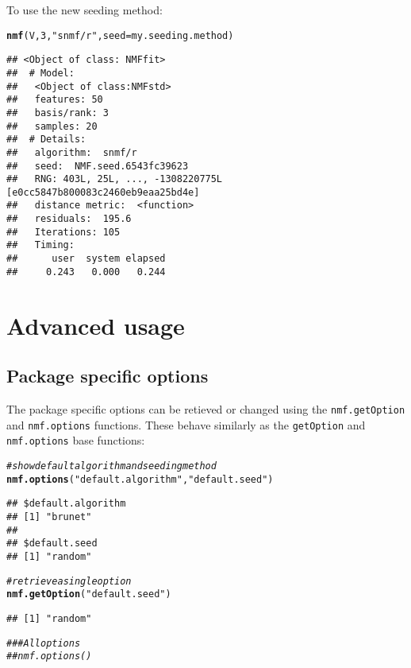 \documentclass[a4paper]{article}\usepackage[]{graphicx}\usepackage[]{color}
\makeatletter
\newcommand{\hlnum}[1]{\textcolor[rgb]{0.686,0.059,0.569}{#1}}%
\newcommand{\hlstr}[1]{\textcolor[rgb]{0.192,0.494,0.8}{#1}}%
\newcommand{\hlcom}[1]{\textcolor[rgb]{0.678,0.584,0.686}{\textit{#1}}}%
\newcommand{\hlstd}[1]{\textcolor[rgb]{0.345,0.345,0.345}{#1}}%
\newcommand{\hlkwc}[1]{\textcolor[rgb]{0.333,0.667,0.333}{#1}}%
\newcommand{\hlkwd}[1]{\textcolor[rgb]{0.737,0.353,0.396}{\textbf{#1}}}%
\newenvironment{kframe}{%
 \def\at@end@of@kframe{}%
 \ifinner\ifhmode%
  \def\at@end@of@kframe{\end{minipage}}%
  \begin{minipage}{\columnwidth}%
 \fi\fi%
 \def\FrameCommand##1{\hskip\@totalleftmargin \hskip-\fboxsep
 \colorbox{shadecolor}{##1}\hskip-\fboxsep
     \hskip-\linewidth \hskip-\@totalleftmargin \hskip\columnwidth}%
 \MakeFramed {\advance\hsize-\width
   \@totalleftmargin\z@ \linewidth\hsize
   \@setminipage}}%
 {\par\unskip\endMakeFramed%
 \at@end@of@kframe}
\newenvironment{knitrout}{}{} %
\let\code=\texttt
\makeatother
\begin{document}
To use the new seeding method:
\begin{knitrout}
\color{fgcolor}\begin{kframe}
\begin{alltt}
\hlkwd{nmf}\hlstd{(V,} \hlnum{3}\hlstd{,} \hlstr{"snmf/r"}\hlstd{,} \hlkwc{seed} \hlstd{= my.seeding.method)}
\end{alltt}
\begin{verbatim}
## <Object of class: NMFfit>
##  # Model:
##   <Object of class:NMFstd>
##   features: 50 
##   basis/rank: 3 
##   samples: 20 
##  # Details:
##   algorithm:  snmf/r 
##   seed:  NMF.seed.6543fc39623 
##   RNG: 403L, 25L, ..., -1308220775L [e0cc5847b800083c2460eb9eaa25bd4e]
##   distance metric:  <function> 
##   residuals:  195.6 
##   Iterations: 105 
##   Timing:
##      user  system elapsed 
##     0.243   0.000   0.244
\end{verbatim}
\end{kframe}
\end{knitrout}


\section{Advanced usage}

\subsection{Package specific options}
The package specific options can be retieved or changed using the \code{nmf.getOption} and \code{nmf.options} functions. 
These behave similarly as the \code{getOption} and \code{nmf.options} base functions:

\begin{knitrout}
\color{fgcolor}\begin{kframe}
\begin{alltt}
\hlcom{# show default algorithm and seeding method}
\hlkwd{nmf.options}\hlstd{(}\hlstr{"default.algorithm"}\hlstd{,} \hlstr{"default.seed"}\hlstd{)}
\end{alltt}
\begin{verbatim}
## $default.algorithm
## [1] "brunet"
## 
## $default.seed
## [1] "random"
\end{verbatim}
\begin{alltt}
\hlcom{# retrieve a single option}
\hlkwd{nmf.getOption}\hlstd{(}\hlstr{"default.seed"}\hlstd{)}
\end{alltt}
\begin{verbatim}
## [1] "random"
\end{verbatim}
\begin{alltt}
\hlcom{## # All options}
\hlcom{## nmf.options()}
\end{alltt}
\end{kframe}
\end{knitrout}
\end{document}
